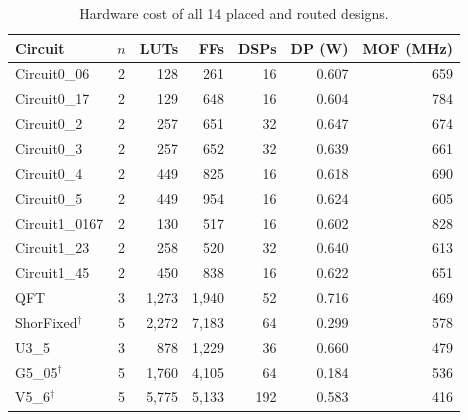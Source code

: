 \begin{table}[ht]
\centering
\footnotesize
\setlength{\tabcolsep}{4pt}
\caption{Hardware cost of all 14 placed and routed designs.}
\label{tab:hardware}
\begin{tabular}{@{}lcrrrrr@{}}
\toprule
Circuit & $n$ & LUTs & FFs & DSPs & DP (W) & MOF (MHz) \\
\midrule
Circuit0\_06 & 2 & 128 & 261 & 16 & 0.607 & 659 \\
Circuit0\_17 & 2 & 129 & 648 & 16 & 0.604 & 784 \\
Circuit0\_2 & 2 & 257 & 651 & 32 & 0.647 & 674 \\
Circuit0\_3 & 2 & 257 & 652 & 32 & 0.639 & 661 \\
Circuit0\_4 & 2 & 449 & 825 & 16 & 0.618 & 690 \\
Circuit0\_5 & 2 & 449 & 954 & 16 & 0.624 & 605 \\
Circuit1\_0167 & 2 & 130 & 517 & 16 & 0.602 & 828 \\
Circuit1\_23 & 2 & 258 & 520 & 32 & 0.640 & 613 \\
Circuit1\_45 & 2 & 450 & 838 & 16 & 0.622 & 651 \\
QFT & 3 & 1,273 & 1,940 & 52 & 0.716 & 469 \\
ShorFixed$^\dag$ & 5 & 2,272 & 7,183 & 64 & 0.299 & 578 \\
U3\_5 & 3 & 878 & 1,229 & 36 & 0.660 & 479 \\
G5\_05$^\dag$ & 5 & 1,760 & 4,105 & 64 & 0.184 & 536 \\
V5\_6$^\dag$ & 5 & 5,775 & 5,133 & 192 & 0.583 & 416 \\
\bottomrule
\end{tabular}
\end{table}
